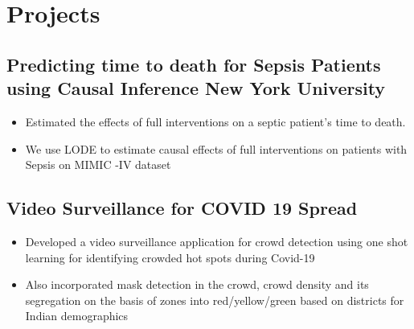 \documentclass[a4,10pt]{article}
\newenvironment{zitemize}{
\begin{itemize}\itemsep0pt \parskip0pt \parsep1pt}
{\end{itemize}\vspace{-0.5cm}}
\begin{document}
\section{Projects} %



\subsection*{Predicting time to death for Sepsis Patients using Causal Inference \hfill New York University} 
    \begin{zitemize}
         \item Estimated the effects of full interventions on a septic patient's time to death. 
         \item  We use LODE to estimate causal effects of full interventions on patients with Sepsis on MIMIC -IV dataset
    \end{zitemize}
\subsection*{Video Surveillance for COVID 19 Spread} 
    \begin{zitemize}
         \item Developed a video surveillance application for crowd detection using one shot learning for identifying crowded hot spots during Covid-19
        \item Also incorporated mask detection in the crowd, crowd density and its segregation on the basis of zones into red/yellow/green based on districts for Indian demographics
    \end{zitemize}


\end{document}
